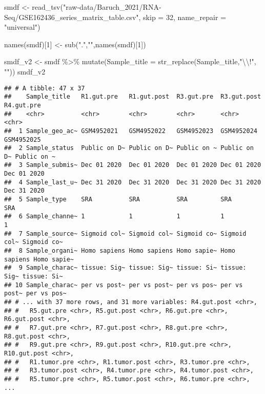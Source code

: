 \documentclass[
]{article}
\newenvironment{Shaded}{\begin{snugshade}}{\end{snugshade}}
\newcommand{\AttributeTok}[1]{\textcolor[rgb]{0.77,0.63,0.00}{#1}}
\newcommand{\DecValTok}[1]{\textcolor[rgb]{0.00,0.00,0.81}{#1}}
\newcommand{\FunctionTok}[1]{\textcolor[rgb]{0.00,0.00,0.00}{#1}}
\newcommand{\NormalTok}[1]{#1}
\newcommand{\OtherTok}[1]{\textcolor[rgb]{0.56,0.35,0.01}{#1}}
\newcommand{\SpecialCharTok}[1]{\textcolor[rgb]{0.00,0.00,0.00}{#1}}
\newcommand{\StringTok}[1]{\textcolor[rgb]{0.31,0.60,0.02}{#1}}
\begin{document}
\begin{Shaded}
\begin{Highlighting}[]
\NormalTok{smdf }\OtherTok{\textless{}{-}} \FunctionTok{read\_tsv}\NormalTok{(}\StringTok{"raw{-}data/Baruch\_2021/RNA{-}Seq/GSE162436\_series\_matrix\_table.csv"}\NormalTok{, }\AttributeTok{skip =} \DecValTok{32}\NormalTok{, }\AttributeTok{name\_repair =} \StringTok{"universal"}\NormalTok{)}

\FunctionTok{names}\NormalTok{(smdf)[}\DecValTok{1}\NormalTok{] }\OtherTok{\textless{}{-}} \FunctionTok{sub}\NormalTok{(}\StringTok{"."}\NormalTok{,}\StringTok{""}\NormalTok{,}\FunctionTok{names}\NormalTok{(smdf)[}\DecValTok{1}\NormalTok{])}
 
\NormalTok{smdf\_v2 }\OtherTok{\textless{}{-}}\NormalTok{ smdf }\SpecialCharTok{\%\textgreater{}\%}
  \FunctionTok{mutate}\NormalTok{(}\AttributeTok{Sample\_title =} \FunctionTok{str\_replace}\NormalTok{(Sample\_title,}\StringTok{"}\SpecialCharTok{\textbackslash{}\textbackslash{}}\StringTok{!"}\NormalTok{, }\StringTok{""}\NormalTok{))}
\NormalTok{smdf\_v2}
\end{Highlighting}
\end{Shaded}

\begin{verbatim}
## # A tibble: 47 x 37
##    Sample_title   R1.gut.pre   R1.gut.post  R3.gut.pre  R3.gut.post  R4.gut.pre 
##    <chr>          <chr>        <chr>        <chr>       <chr>        <chr>      
##  1 Sample_geo_ac~ GSM4952021   GSM4952022   GSM4952023  GSM4952024   GSM4952025 
##  2 Sample_status  Public on D~ Public on D~ Public on ~ Public on D~ Public on ~
##  3 Sample_submis~ Dec 01 2020  Dec 01 2020  Dec 01 2020 Dec 01 2020  Dec 01 2020
##  4 Sample_last_u~ Dec 31 2020  Dec 31 2020  Dec 31 2020 Dec 31 2020  Dec 31 2020
##  5 Sample_type    SRA          SRA          SRA         SRA          SRA        
##  6 Sample_channe~ 1            1            1           1            1          
##  7 Sample_source~ Sigmoid col~ Sigmoid col~ Sigmoid co~ Sigmoid col~ Sigmoid co~
##  8 Sample_organi~ Homo sapiens Homo sapiens Homo sapie~ Homo sapiens Homo sapie~
##  9 Sample_charac~ tissue: Sig~ tissue: Sig~ tissue: Si~ tissue: Sig~ tissue: Si~
## 10 Sample_charac~ per vs post~ per vs post~ per vs pos~ per vs post~ per vs pos~
## # ... with 37 more rows, and 31 more variables: R4.gut.post <chr>,
## #   R5.gut.pre <chr>, R5.gut.post <chr>, R6.gut.pre <chr>, R6.gut.post <chr>,
## #   R7.gut.pre <chr>, R7.gut.post <chr>, R8.gut.pre <chr>, R8.gut.post <chr>,
## #   R9.gut.pre <chr>, R9.gut.post <chr>, R10.gut.pre <chr>, R10.gut.post <chr>,
## #   R1.tumor.pre <chr>, R1.tumor.post <chr>, R3.tumor.pre <chr>,
## #   R3.tumor.post <chr>, R4.tumor.pre <chr>, R4.tumor.post <chr>,
## #   R5.tumor.pre <chr>, R5.tumor.post <chr>, R6.tumor.pre <chr>, ...
\end{verbatim}
\end{document}
